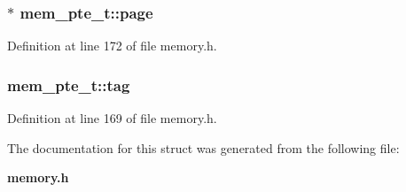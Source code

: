 \subsubsection[{page}]{$\ast$ {\bf mem\_\-pte\_\-t::page}}\label{structmem__pte__t_0044642b3c5d8cea06da68bd9a4a6a19}




Definition at line 172 of file memory.h.
\subsubsection[{tag}]{ {\bf mem\_\-pte\_\-t::tag}}\label{structmem__pte__t_5301d21ca3307cc366ad0b2b0bb9cc62}




Definition at line 169 of file memory.h.

The documentation for this struct was generated from the following file:\begin{CompactItemize}
\item 
{\bf memory.h}\end{CompactItemize}
